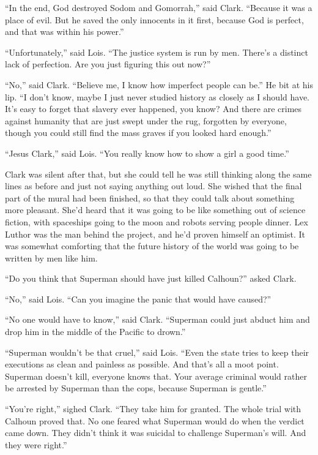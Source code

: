 \documentclass[ebook,12pt]{memoir}
\begin{document}
``In the end, God destroyed Sodom and Gomorrah,'' said Clark. ``Because
it was a place of evil. But he saved the only innocents in it first,
because God is perfect, and that was within his power.''

``Unfortunately,'' said Lois. ``The justice system is run by men.
There's a distinct lack of perfection. Are you just figuring this out
now?''

``No,'' said Clark. ``Believe me, I know how imperfect people can be.''
He bit at his lip. ``I don't know, maybe I just never studied history as
closely as I should have. It's easy to forget that slavery ever
happened, you know? And there are crimes against humanity that are just
swept under the rug, forgotten by everyone, though you could still find
the mass graves if you looked hard enough.''

``Jesus Clark,'' said Lois. ``You really know how to show a girl a good
time.''

Clark was silent after that, but she could tell he was still thinking
along the same lines as before and just not saying anything out loud.
She wished that the final part of the mural had been finished, so that
they could talk about something more pleasant. She'd heard that it was
going to be like something out of science fiction, with spaceships going
to the moon and robots serving people dinner. Lex Luthor was the man
behind the project, and he'd proven himself an optimist. It was somewhat
comforting that the future history of the world was going to be written
by men like him.

``Do you think that Superman should have just killed Calhoun?'' asked
Clark.

``No,'' said Lois. ``Can you imagine the panic that would have caused?''

``No one would have to know,'' said Clark. ``Superman could just abduct
him and drop him in the middle of the Pacific to drown.''

``Superman wouldn't be that cruel,'' said Lois. ``Even the state tries
to keep their executions as clean and painless as possible. And that's
all a moot point. Superman doesn't kill, everyone knows that. Your
average criminal would rather be arrested by Superman than the cops,
because Superman is gentle.''

``You're right,'' sighed Clark. ``They take him for granted. The whole
trial with Calhoun proved that. No one feared what Superman would do
when the verdict came down. They didn't think it was suicidal to
challenge Superman's will. And they were right.''
\end{document}
